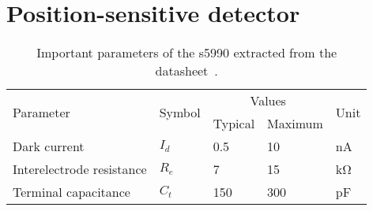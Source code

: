 \section{Position-sensitive detector}


\cite{Noorlag74} %


\begin{table}[H]
	\centering
	\begin{tabular}{lllll}
		\toprule
			\multirow{2}[3]{*}{Parameter} &
			\multirow{2}[3]{*}{Symbol} &
			\multicolumn{2}{c}{Values} &
			\multirow{2}[3]{*}{Unit} \\
			\cmidrule(lr){3-4} & & Typical & Maximum & \\
		\midrule
		Dark current & $I_d$ & \num{0.5} & \num{10} & \si{\nano\ampere}\\
		Interelectrode resistance & $R_e$ & \num{7} & \num{15} & \si{\kilo\ohm}\\
		Terminal capacitance & $C_t$ & \num{150} & \num{300} & \si{\pico\farad}\\
		\bottomrule	
	\end{tabular}
	\caption{Important parameters of the \gls{s5990} extracted from the datasheet~\cite{HamamatsuS5990}.}\label{tab:psd_s5990}
\end{table}


